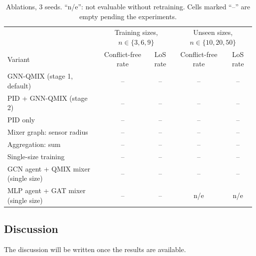 \begin{table}[hbt!]
\caption{\label{tab:ablation} Ablations, 3 seeds. ``n/e'': not evaluable without retraining.
Cells marked ``--'' are empty pending the experiments.}
\centering
\begin{tabular}{lcccc}
\hline
 & \multicolumn{2}{c}{Training sizes, $n\in\{3,6,9\}$} & \multicolumn{2}{c}{Unseen sizes, $n\in\{10,20,50\}$} \\
Variant & Conflict-free rate & LoS rate & Conflict-free rate & LoS rate \\
\hline
GNN-QMIX (stage 1, default)          & -- & -- & -- & -- \\
PID + GNN-QMIX (stage 2)             & -- & -- & -- & -- \\
PID only                             & -- & -- & -- & -- \\
Mixer graph: sensor radius           & -- & -- & -- & -- \\
Aggregation: sum                     & -- & -- & -- & -- \\
Single-size training                 & -- & -- & -- & -- \\
GCN agent + QMIX mixer (single size) & -- & -- & -- & -- \\
MLP agent + GAT mixer (single size)  & -- & -- & n/e & n/e \\
\hline
\end{tabular}
\end{table}

\subsection{Discussion}
\label{subsec:results-discussion}
The discussion will be written once the results are available.

